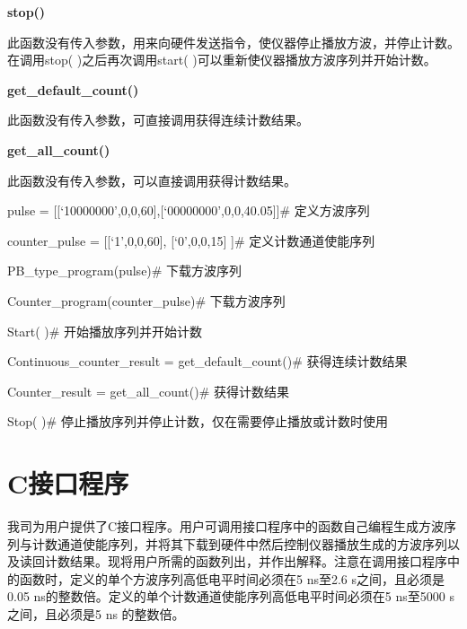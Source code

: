 \noindent\fontsize{12pt}{\baselineskip}\textbf{stop()}

此函数没有传入参数，用来向硬件发送指令，使仪器停止播放方波，并停止计数。在调用stop( )之后再次调用start( )可以重新使仪器播放方波序列并开始计数。
\vspace{0.4cm}

\noindent\fontsize{12pt}{\baselineskip}\textbf{get\_default\_count()}

此函数没有传入参数，可直接调用获得连续计数结果。
\vspace{0.4cm}

\noindent\fontsize{12pt}{\baselineskip}\textbf{get\_all\_count()}

此函数没有传入参数，可以直接调用获得计数结果。
\vspace{0.4cm}

\noindent\fontsize{12pt}{\baselineskip}\textbf{}

pulse = [[`10000000',0,0,60],[`00000000',0,0,40.05]]\qquad \#  定义方波序列

counter\_pulse = [[`1',0,0,60], [`0',0,0,15] ]\qquad        \#  定义计数通道使能序列

PB\_type\_program(pulse)\qquad            \#  下载方波序列

Counter\_program(counter\_pulse)\qquad     \#  下载方波序列

Start( )\qquad          \#  开始播放序列并开始计数

Continuous\_counter\_result = get\_default\_count()\qquad    \#  获得连续计数结果

Counter\_result = get\_all\_count()\qquad                  \#  获得计数结果

Stop( )\qquad     \#  停止播放序列并停止计数，仅在需要停止播放或计数时使用

\section{C\heiti 接口程序}
我司为用户提供了C接口程序。用户可调用接口程序中的函数自己编程生成方波序列与计数通道使能序列，并将其下载到硬件中然后控制仪器播放生成的方波序列以及读回计数结果。现将用户所需的函数列出，并作出解释。注意在调用接口程序中的函数时，定义的单个方波序列高低电平时间必须在5 ns至2.6 s之间，且必须是0.05 ns的整数倍。定义的单个计数通道使能序列高低电平时间必须在5 ns至5000 s之间，且必须是5 ns 的整数倍。

